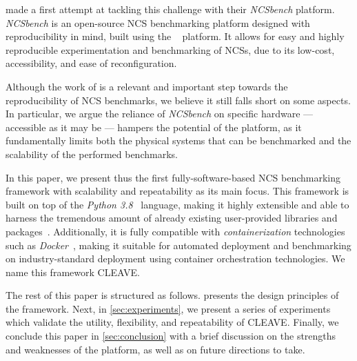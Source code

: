 \textcite{Zoppi2020NCSBench} made a first attempt at tackling this challenge with their \emph{NCSbench} platform.
\emph{NCSbench} is an open-source \ac{NCS} benchmarking platform designed with reproducibility in mind, built using the ~\cite{LEGOMindstormsEV3} platform.
It allows for easy and highly reproducible experimentation and benchmarking of \acp{NCS}, due to its low-cost, accessibility, and ease of reconfiguration.

Although the work of \textcite{Zoppi2020NCSBench} is a relevant and important step towards the reproducibility of \ac{NCS} benchmarks, we believe it still falls short on some aspects.
In particular, we argue the reliance of \emph{NCSbench} on specific hardware --- accessible as it may be --- hampers the potential of the platform, as it fundamentally limits both the physical systems that can be benchmarked and the scalability of the performed benchmarks.

In this paper, we present thus the first fully-software-based \ac{NCS} benchmarking framework with scalability and repeatability as its main focus.
This framework is built on top of the \emph{Python 3.8}~\cite{Python3.8} language, making it highly extensible and able to harness the tremendous amount of already existing user-provided libraries and packages~\cite{pypi}.
Additionally, it is fully compatible with \emph{containerization} technologies such as \emph{Docker}~\cite{merkel2014docker}, making it suitable for automated deployment and benchmarking on industry-standard deployment using container orchestration technologies.
We name this framework \ac{CLEAVE}.

The rest of this paper is structured as follows.
 presents the design principles of the framework.
Next, in \cref{sec:experiments}, we present a series of experiments which validate the utility, flexibility, and repeatability of \ac{CLEAVE}.
Finally, we conclude this paper in \cref{sec:conclusion} with a brief discussion on the strengths and weaknesses of the platform, as well as on future directions to take.